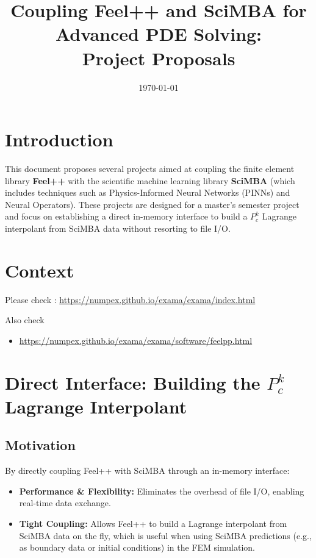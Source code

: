 \documentclass[11pt]{article}
\title{Coupling Feel++ and SciMBA for Advanced PDE Solving:\\ Project Proposals}
\date{\today}
\begin{document}
\maketitle

\section{Introduction}
This document proposes several projects aimed at coupling the finite element library \textbf{Feel++} with the scientific machine learning library \textbf{SciMBA} (which includes techniques such as Physics-Informed Neural Networks (PINNs) and Neural Operators). These projects are designed for a master’s semester project and focus on establishing a direct in-memory interface to build a \( P_c^k \) Lagrange interpolant from SciMBA data without resorting to file I/O.

\section{Context}

Please check : \url{https://numpex.github.io/exama/exama/index.html}

Also check
\begin{itemize}
    \item \url{https://numpex.github.io/exama/exama/software/feelpp.html}
\end{itemize}
\section{Direct Interface: Building the \( P_c^k \) Lagrange Interpolant}

\subsection{Motivation}
By directly coupling Feel++ with SciMBA through an in-memory interface:
\begin{itemize}
    \item \textbf{Performance \& Flexibility:} Eliminates the overhead of file I/O, enabling real-time data exchange.
    \item \textbf{Tight Coupling:} Allows Feel++ to build a Lagrange interpolant from SciMBA data on the fly, which is useful when using SciMBA predictions (e.g., as boundary data or initial conditions) in the FEM simulation.
\end{itemize}
\end{document}
